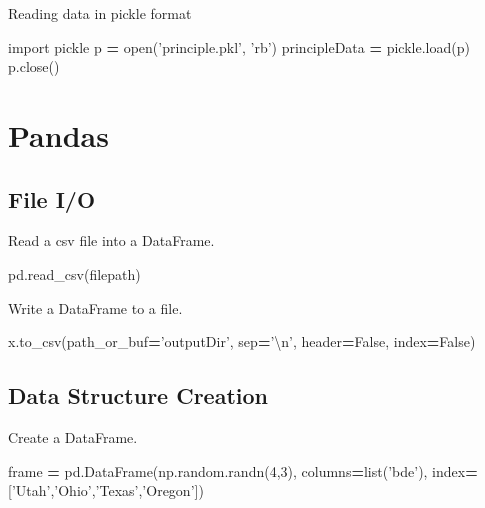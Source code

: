 \documentclass[]{book}
\newenvironment{Shaded}{\begin{snugshade}}{\end{snugshade}}
\newcommand{\DecValTok}[1]{\textcolor[rgb]{0.00,0.00,0.81}{#1}}
\newcommand{\CharTok}[1]{\textcolor[rgb]{0.31,0.60,0.02}{#1}}
\newcommand{\StringTok}[1]{\textcolor[rgb]{0.31,0.60,0.02}{#1}}
\newcommand{\ImportTok}[1]{#1}
\newcommand{\VariableTok}[1]{\textcolor[rgb]{0.00,0.00,0.00}{#1}}
\newcommand{\OperatorTok}[1]{\textcolor[rgb]{0.81,0.36,0.00}{\textbf{#1}}}
\newcommand{\BuiltInTok}[1]{#1}
\newcommand{\NormalTok}[1]{#1}
\begin{document}
Reading data in pickle format

\begin{Shaded}
\begin{Highlighting}[]
\ImportTok{import}\NormalTok{ pickle}
\NormalTok{p }\OperatorTok{=} \BuiltInTok{open}\NormalTok{(}\StringTok{'principle.pkl'}\NormalTok{, }\StringTok{'rb'}\NormalTok{)}
\NormalTok{principleData }\OperatorTok{=}\NormalTok{ pickle.load(p)}
\NormalTok{p.close()}
\end{Highlighting}
\end{Shaded}

\chapter{Pandas}\label{pandas}

\section{File I/O}\label{file-io}

Read a csv file into a DataFrame.

\begin{Shaded}
\begin{Highlighting}[]
\NormalTok{pd.read_csv(filepath)}
\end{Highlighting}
\end{Shaded}

Write a DataFrame to a file.

\begin{Shaded}
\begin{Highlighting}[]
\NormalTok{x.to_csv(path_or_buf}\OperatorTok{=}\StringTok{'outputDir'}\NormalTok{, sep}\OperatorTok{=}\StringTok{'}\CharTok{\textbackslash{}n}\StringTok{'}\NormalTok{, header}\OperatorTok{=}\VariableTok{False}\NormalTok{, index}\OperatorTok{=}\VariableTok{False}\NormalTok{)}
\end{Highlighting}
\end{Shaded}

\section{Data Structure Creation}\label{data-structure-creation}

Create a DataFrame.

\begin{Shaded}
\begin{Highlighting}[]
\NormalTok{frame }\OperatorTok{=}\NormalTok{ pd.DataFrame(np.random.randn(}\DecValTok{4}\NormalTok{,}\DecValTok{3}\NormalTok{), columns}\OperatorTok{=}\BuiltInTok{list}\NormalTok{(}\StringTok{'bde'}\NormalTok{), index}\OperatorTok{=}\NormalTok{[}\StringTok{'Utah'}\NormalTok{,}\StringTok{'Ohio'}\NormalTok{,}\StringTok{'Texas'}\NormalTok{,}\StringTok{'Oregon'}\NormalTok{])}
\end{Highlighting}
\end{Shaded}
\end{document}
